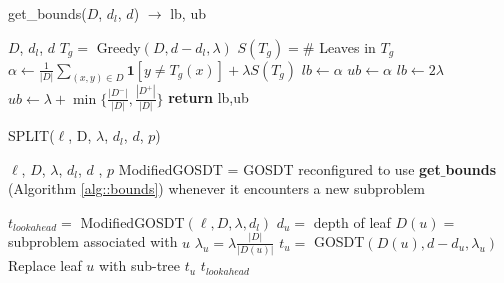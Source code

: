 \begin{algorithm}[ht]
\caption{get\_bounds($D$, $d_l$, $d$) $\to$ lb, ub}
\label{alg::bounds}
\begin{algorithmic}[1]
\REQUIRE $D$, $d_l$, $d$ \COMMENT{\textcolor{commentgreen}{support, lookahead depth, current search depth}}
\STATE $T_g = $ Greedy$(D,d-d_l,\lambda)$ 
\STATE $S(T_g) = \# $ Leaves in $T_g $
\STATE $\alpha\gets \frac{1}{|D|}\sum_{(x,y) \in D} \mathbf{1}[y \neq T_g(x)] + \lambda S(T_g)$
\STATE $lb \gets \alpha$ 
\STATE $ub \gets \alpha$ \COMMENT{\textcolor{commentgreen}{subproblem solved because ub = lb}}
\ELSE[\textcolor{commentgreen}{use basic initial bounds}]
    \STATE $lb \gets 2\lambda$ 
    \STATE $ub \gets \lambda + \min \Big\{\frac{|D^-|}{|D|}, \frac{|D^+|}{|D|}\Big\}$ 
\ENDIF
\STATE \textbf{return} lb,ub \COMMENT{\textcolor{commentgreen}{Return Lower and Upper Bounds}}
\end{algorithmic}
\end{algorithm}
\begin{algorithm}[t]
\caption{SPLIT($\ell$, D, $\lambda$, $d_l$, $d$, $p$)}
\label{alg::lookahead}
\begin{algorithmic}[1]
\REQUIRE $\ell$, $D$, $\lambda$, $d_l$, $d$ , $p$ \COMMENT{\textcolor{commentgreen}{loss function, samples, regularizer, lookahead depth, depth budget, postprocess flag}} 
\vspace{-0.32cm}
\STATE ModifiedGOSDT = GOSDT reconfigured to use \textbf{get$\_$bounds} (Algorithm \ref{alg::bounds}) whenever it encounters a new subproblem
\item $t_{lookahead} = $ ModifiedGOSDT$(\ell, D, \lambda,d_l)$ \COMMENT{\textcolor{commentgreen}{Call ModifiedGOSDT with depth budget $d_l$}}
    \STATE $d_{u} = $ depth of leaf 
    \STATE $D(u) = $ subproblem associated with $u$
    \STATE $\lambda_{u} = \lambda \frac{|D|}{|D(u)|}$ \COMMENT{\textcolor{commentgreen}{Renormalize $\lambda$ for the subproblem in question}}
    \STATE $t_u = $ GOSDT$(D(u), d - d_{u},\lambda_{u})$ \COMMENT{\textcolor{commentgreen}{Find the optimal subtree for $D(u)$}}
    \STATE Replace leaf $u$ with sub-tree $t_u$
    \ENDIF
\ENDFOR
\ENDIF
\RETURN $t_{lookahead}$
\end{algorithmic}
\end{algorithm}
